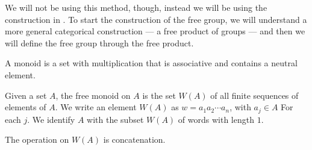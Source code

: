 We will not be using this method, though, instead we will be using the construction in \cite{delaHarpe_topics_in_geometric_group_theory}. To start the construction of the free group, we will understand a more general categorical construction --- a free product of groups --- and then we will define the free group through the free product. %
\begin{definition}
  A monoid is a set with multiplication that is associative and contains a neutral element.\newline

  Given a set $A$, the free monoid on $A$ is the set $W(A)$ of all finite sequences of elements of $A$. We write an element $W(A)$ as $w = a_1a_2\cdots a_n$, with $a_j\in A$ For each $j$. We identify $A$ with the subset $W(A)$ of words with length $1$.\newline

  The operation on $W(A)$ is concatenation.
\end{definition}

